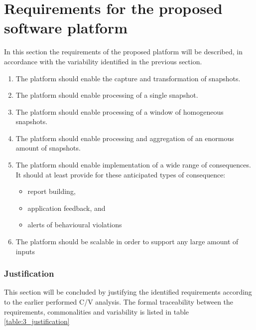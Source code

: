 \section{Requirements for the proposed software platform}
In this section the requirements of the proposed platform will be described, in accordance with the variability identified in the previous section.
\begin{enumerate}[label=R\archid .\arabic*]
\nospace
\item \label{r:snaptshot_transformation} The platform should enable the capture and transformation of snapshots.
\item \label{r:basis_single} The platform should enable processing of a single snapshot.
\item \label{r:basis_historic} The platform should enable processing of a window of homogeneous snapshots.
\item \label{r:basis_accumulated} The platform should enable processing and aggregation of an enormous amount of snapshots.
\item \label{r:consequence} The platform should enable implementation of a wide range of consequences. It should at least provide for these anticipated types of consequence:
\begin{itemize}
\nospace
\item report building,
\item application feedback, and
\item alerts of behavioural violations
\end{itemize}
\item \label{r:scale} The platform should be scalable in order to support any large amount of inputs
\end{enumerate}

\subsubsection*{Justification}
This section will be concluded by justifying the identified requirements according to the earlier performed C/V analysis. The formal traceability between the requirements, commonalities and variability is listed in table \ref{table:3_justification}

